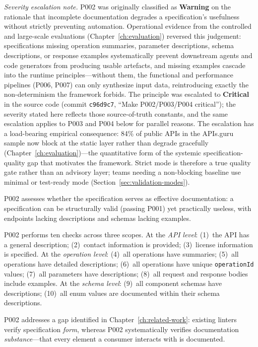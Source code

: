 \textit{Severity escalation note.} P002 was originally classified as \textbf{Warning} on the rationale that incomplete documentation degrades a specification's usefulness without strictly preventing automation. Operational evidence from the controlled and large-scale evaluations (Chapter~\ref{ch:evaluation}) reversed this judgement: specifications missing operation summaries, parameter descriptions, schema descriptions, or response examples systematically prevent downstream agents and code generators from producing usable artefacts, and missing examples cascade into the runtime principles---without them, the functional and performance pipelines (P006, P007) can only synthesize input data, reintroducing exactly the non-determinism the framework forbids. The principle was escalated to \textbf{Critical} in the source code (commit \texttt{c96d9c7}, ``Make P002/P003/P004 critical''); the severity stated here reflects those source-of-truth constants, and the same escalation applies to P003 and P004 below for parallel reasons. The escalation has a load-bearing empirical consequence: 84\% of public APIs in the APIs.guru sample now block at the static layer rather than degrade gracefully (Chapter~\ref{ch:evaluation})---the quantitative form of the systemic specification-quality gap that motivates the framework. Strict mode is therefore a true quality gate rather than an advisory layer; teams needing a non-blocking baseline use minimal or test-ready mode (Section~\ref{sec:validation-modes}).

P002 assesses whether the specification serves as effective documentation: a specification can be structurally valid (passing P001) yet practically useless, with endpoints lacking descriptions and schemas lacking examples.

P002 performs ten checks across three scopes. At the \textit{API level}: (1)~the API has a general description; (2)~contact information is provided; (3)~license information is specified. At the \textit{operation level}: (4)~all operations have summaries; (5)~all operations have detailed descriptions; (6)~all operations have unique \texttt{operationId} values; (7)~all parameters have descriptions; (8)~all request and response bodies include examples. At the \textit{schema level}: (9)~all component schemas have descriptions; (10)~all enum values are documented within their schema descriptions.

P002 addresses a gap identified in Chapter~\ref{ch:related-work}: existing linters verify specification \textit{form}, whereas P002 systematically verifies documentation \textit{substance}---that every element a consumer interacts with is documented.

